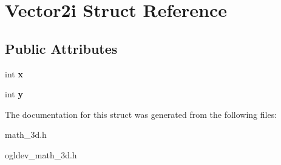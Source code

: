 \hypertarget{structVector2i}{\section{Vector2i Struct Reference}
\label{structVector2i}
}
\subsection*{Public Attributes}
\begin{DoxyCompactItemize}
\item 
\hypertarget{structVector2i_ad63e78f71457439cc910f38cfa019b4e}{int {\bfseries x}}\label{structVector2i_ad63e78f71457439cc910f38cfa019b4e}

\item 
\hypertarget{structVector2i_a9a3ca58ba0f5d84bf305ddca107780d8}{int {\bfseries y}}\label{structVector2i_a9a3ca58ba0f5d84bf305ddca107780d8}

\end{DoxyCompactItemize}


The documentation for this struct was generated from the following files\-:\begin{DoxyCompactItemize}
\item 
math\-\_\-3d.\-h\item 
ogldev\-\_\-math\-\_\-3d.\-h\end{DoxyCompactItemize}
